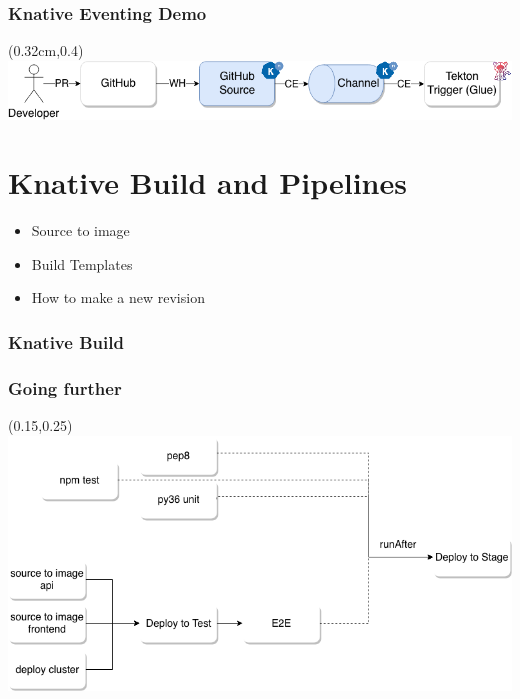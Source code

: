 \documentclass[aspectratio=169,11pt,hyperref={colorlinks=true}]{beamer}
\begin{document}
\begin{lblackrwhiteframe}
\begin{lblackrwhiteframe}
\begin{tblackbgrayframe}
  \frametitle{Knative Eventing Demo}
  \begin{textblock*}{\paperwidth}(0.32cm,0.4\paperheight)
    \centering
    \includegraphics[width=0.8\paperwidth]{img/knative-serving-eventing-demo.png}
  \end{textblock*}
\end{tblackbgrayframe}

\section{Knative Build and Pipelines}

\begin{2columnsframe}
  {
  \begin{itemize}
    \item Source to image
    \item Build Templates
    \item How to make a new revision
  \end{itemize}
  }
  {
  
  }
  \frametitle{Knative Build}
\end{2columnsframe}

\begin{tblackbgrayframe}
  \frametitle{Going further}
  \begin{textblock*}{0.75\paperwidth}(0.15\paperwidth,0.25\paperheight)
    \includegraphics[width=0.75\paperwidth]{img/test-pipeline.png}
  \end{textblock*}
\end{tblackbgrayframe}


\end{lblackrwhiteframe}
\end{lblackrwhiteframe}
\end{document}
